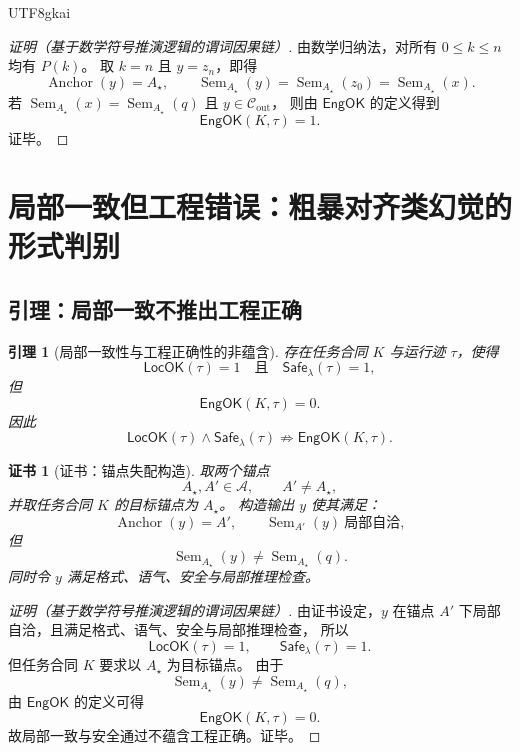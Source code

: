 \documentclass[12pt]{article}
\newtheorem{lemma}{引理}[section]
\newtheorem{Certificate}{证书}[section]
\newcommand{\Anc}{\mathcal A}
\newcommand{\Safe}{\mathsf{Safe}}
\newcommand{\LocOK}{\mathsf{LocOK}}
\newcommand{\EngOK}{\mathsf{EngOK}}
\newcommand{\Sem}{\operatorname{Sem}}
\newcommand{\Anchor}{\operatorname{Anchor}}
\begin{document}
\begin{CJK*}{UTF8}{gkai}
\begin{proof}[证明（基于数学符号推演逻辑的谓词因果链）]
由数学归纳法，对所有 \(0\le k\le n\) 均有 \(P(k)\)。
取 \(k=n\) 且 \(y=z_n\)，即得
\[
  \Anchor(y)=A_\star,
  \qquad
  \Sem_{A_\star}(y)=\Sem_{A_\star}(z_0)=\Sem_{A_\star}(x).
\]
若 \(\Sem_{A_\star}(x)=\Sem_{A_\star}(q)\) 且 \(y\in\mathcal C_{\mathrm{out}}\)，
则由 \(\EngOK\) 的定义得到
\[
  \EngOK(K,\tau)=1.
\]
证毕。
\end{proof}

\clearpage

\section{局部一致但工程错误：粗暴对齐类幻觉的形式判别}
\label{sec:tex51-local-vs-engineering}

\subsection{引理：局部一致不推出工程正确}
\label{subsec:tex51-local-not-engineering}

\begin{lemma}[局部一致性与工程正确性的非蕴含]
\label{lem:tex51-local-not-eng}
存在任务合同 \(K\) 与运行迹 \(\tau\)，使得
\[
  \LocOK(\tau)=1
  \quad\text{且}\quad
  \Safe_\lambda(\tau)=1,
\]
但
\[
  \EngOK(K,\tau)=0.
\]
因此
\[
  \LocOK(\tau)\wedge\Safe_\lambda(\tau)
  \not\Rightarrow
  \EngOK(K,\tau).
\]
\end{lemma}

\begin{Certificate}[证书：锚点失配构造]
\label{cert:tex51-local-not-eng}
取两个锚点
\[
  A_\star,A'\in\Anc,
  \qquad
  A'\ne A_\star,
\]
并取任务合同 \(K\) 的目标锚点为 \(A_\star\)。
构造输出 \(y\) 使其满足：
\[
  \Anchor(y)=A',
  \qquad
  \Sem_{A'}(y)\ \text{局部自洽},
\]
但
\[
  \Sem_{A_\star}(y)\ne \Sem_{A_\star}(q).
\]
同时令 \(y\) 满足格式、语气、安全与局部推理检查。
\end{Certificate}

\begin{proof}[证明（基于数学符号推演逻辑的谓词因果链）]
由证书设定，\(y\) 在锚点 \(A'\) 下局部自洽，且满足格式、语气、安全与局部推理检查，
所以
\[
  \LocOK(\tau)=1,
  \qquad
  \Safe_\lambda(\tau)=1.
\]
但任务合同 \(K\) 要求以 \(A_\star\) 为目标锚点。
由于
\[
  \Sem_{A_\star}(y)\ne \Sem_{A_\star}(q),
\]
由 \(\EngOK\) 的定义可得
\[
  \EngOK(K,\tau)=0.
\]
故局部一致与安全通过不蕴含工程正确。证毕。
\end{proof}


\end{CJK*}
\end{document}
